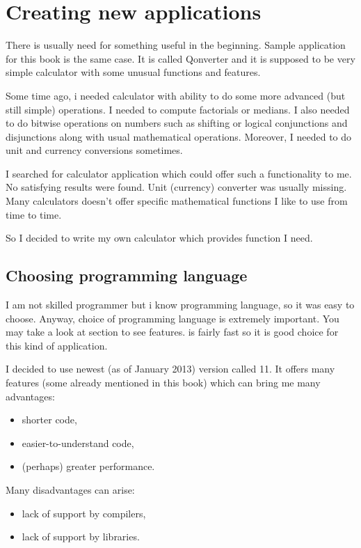\chapter{Creating new applications}\label{chap:new}
There is usually need for something useful in the beginning. Sample application for this book is the same case. It is called Qonverter and it is supposed to be very simple calculator with some unusual functions and features.

Some time ago, i needed calculator with ability to do some more advanced (but still simple) operations. I needed to compute factorials or medians. I also needed to do bitwise operations on numbers such as shifting or logical conjunctions and disjunctions along with usual mathematical operations. Moreover, I needed to do unit and currency conversions sometimes.

I searched for calculator application which could offer such a functionality to me. No satisfying results were found. Unit (currency) converter was usually missing. Many calculators doesn't offer specific mathematical functions I like to use from time to time.

So I decided to write my own calculator which provides function I need.

\section{Choosing programming language}
I am not skilled programmer but i know \cpp{} programming language, so it was easy to choose. Anyway, choice of programming language is extremely important. You may take a look at section  to see \cpp{} features. \cpp{} is fairly fast so it is good choice for this kind of application.

I decided to use newest (as of January 2013) \cpp{} version called \cpp{} 11. It offers many features (some already mentioned in this book) which can bring me many advantages:
\begin{itemize}
\item shorter code,
\item easier-to-understand code,
\item (perhaps) greater performance.
\end{itemize}

Many disadvantages can arise:
\begin{itemize}
\item lack of support by \cpp{} compilers,
\item lack of support by libraries.
\end{itemize}

